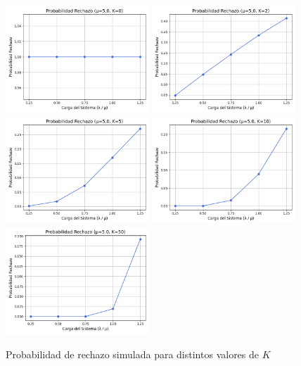 \documentclass[12pt]{article}
\begin{document}
\begin{figure}[H]
    \centering
    \includegraphics[width=0.48\textwidth]{graficas/mm1k/k_0/probabilidad_rechazo.png}
    \includegraphics[width=0.48\textwidth]{graficas/mm1k/k_2/probabilidad_rechazo.png}
    \includegraphics[width=0.48\textwidth]{graficas/mm1k/k_5/probabilidad_rechazo.png}
    \includegraphics[width=0.48\textwidth]{graficas/mm1k/k_10/probabilidad_rechazo.png}
    \includegraphics[width=0.48\textwidth]{graficas/mm1k/k_50/probabilidad_rechazo.png}
    \caption{Probabilidad de rechazo simulada para distintos valores de \( K \)}
\end{figure}
\end{document}
